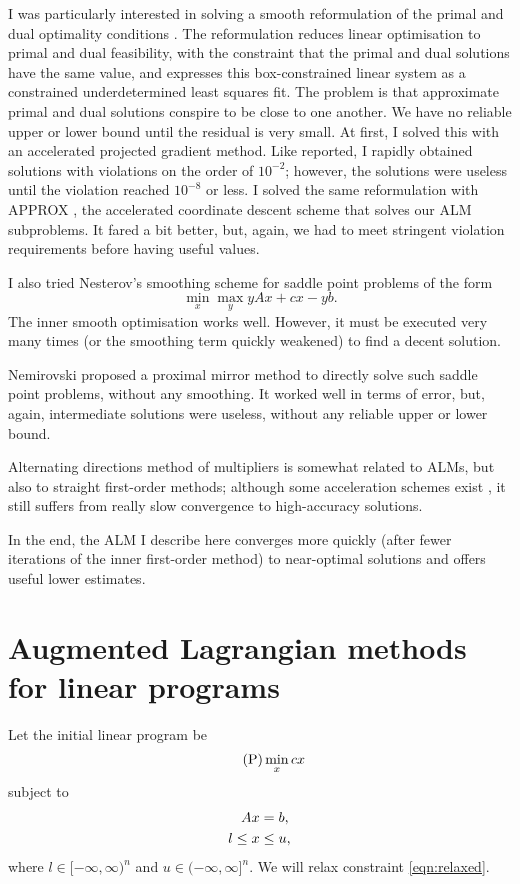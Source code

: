 \documentclass{article}
\newcommand{\LeftEqNo}{\let\veqno\leqno}
\begin{document}
I was particularly interested in solving a smooth reformulation of the
primal and dual optimality conditions \citep{Lan:2011tn}.  The
reformulation reduces linear optimisation to primal and dual
feasibility, with the constraint that the primal and dual solutions
have the same value, and expresses this box-constrained linear system
as a constrained underdetermined least squares fit.  The problem is
that approximate primal and dual solutions conspire to be close to one
another. We have no reliable upper or lower bound until the residual
is very small.  At first, I solved this with an accelerated projected
gradient method.  Like \citep{Lan:2011tn} reported, I rapidly obtained
solutions with violations on the order of \(10^{-2}\); however, the
solutions were useless until the violation reached \(10^{-8}\) or
less.  I solved the same reformulation with APPROX
\citep{Fercoq:2013wv}, the accelerated coordinate descent scheme that
solves our ALM subproblems.  It fared a bit better, but, again, we had
to meet stringent violation requirements before having useful values.

I also tried Nesterov's smoothing scheme \citep{Nesterov:2005p2323}
for saddle point problems of the form
\[\min_x\max_y yAx + cx - yb.\]
The inner smooth optimisation works well.  However, it must be
executed very many times (or the smoothing term quickly weakened) to
find a decent solution.

Nemirovski proposed a proximal mirror method \citep{Nemirovski:2004tm}
to directly solve such saddle point problems, without any smoothing.
It worked well in terms of error, but, again, intermediate solutions
were useless, without any reliable upper or lower bound.

Alternating directions method of multipliers
\citep{Eckstein:2012vb,Parikh:2013vb} is somewhat related to ALMs, but
also to straight first-order methods; although some acceleration
schemes exist \citep{Goldstein:2012vw}, it still suffers from really
slow convergence to high-accuracy solutions.

In the end, the ALM I describe here converges more quickly (after fewer
iterations of the inner first-order method) to near-optimal solutions
and offers useful lower estimates.

\section{Augmented Lagrangian methods for linear programs}
Let the initial linear program be
\begin{equation}\LeftEqNo
\label{form:P}\tag{P} \min_x cx
\end{equation}
subject to
\begin{align}
Ax &= b,\label{eqn:relaxed}\\
l \leq x &\leq u,\notag
\end{align} where \(l\in[-\infty,\infty)^n\) and
\(u\in(-\infty,\infty]^n\).  We will relax constraint
\eqref{eqn:relaxed}.
\end{document}
